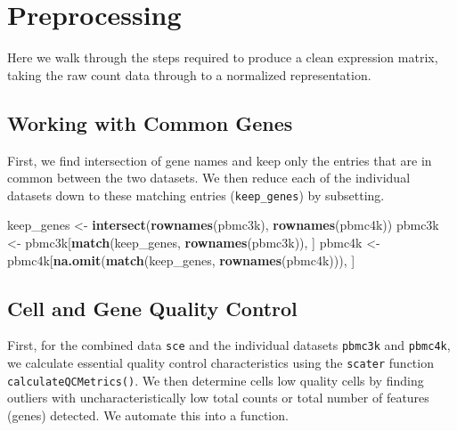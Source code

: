 \documentclass[]{book}
\newenvironment{Shaded}{\begin{snugshade}}{\end{snugshade}}
\newcommand{\KeywordTok}[1]{\textcolor[rgb]{0.13,0.29,0.53}{\textbf{#1}}}
\newcommand{\NormalTok}[1]{#1}
\newcommand{\StringTok}[1]{\textcolor[rgb]{0.31,0.60,0.02}{#1}}
\begin{document}
\hypertarget{preprocessing}{%
\section{Preprocessing}\label{preprocessing}}

Here we walk through the steps required to produce a clean expression matrix, taking the raw count data through to a normalized representation.

\hypertarget{working-with-common-genes}{%
\subsection{Working with Common Genes}\label{working-with-common-genes}}

First, we find intersection of gene names and keep only the entries that are in common between the two datasets. We then reduce each of the individual datasets down to these matching entries (\texttt{keep\_genes}) by subsetting.

\begin{Shaded}
\begin{Highlighting}[]
\NormalTok{keep_genes <-}\StringTok{ }\KeywordTok{intersect}\NormalTok{(}\KeywordTok{rownames}\NormalTok{(pbmc3k), }\KeywordTok{rownames}\NormalTok{(pbmc4k))}
\NormalTok{pbmc3k <-}\StringTok{ }\NormalTok{pbmc3k[}\KeywordTok{match}\NormalTok{(keep_genes, }\KeywordTok{rownames}\NormalTok{(pbmc3k)), ]}
\NormalTok{pbmc4k <-}\StringTok{ }\NormalTok{pbmc4k[}\KeywordTok{na.omit}\NormalTok{(}\KeywordTok{match}\NormalTok{(keep_genes, }\KeywordTok{rownames}\NormalTok{(pbmc4k))), ]}
\end{Highlighting}
\end{Shaded}

\hypertarget{cell-and-gene-quality-control}{%
\subsection{Cell and Gene Quality Control}\label{cell-and-gene-quality-control}}

First, for the combined data \texttt{sce} and the individual datasets \texttt{pbmc3k} and \texttt{pbmc4k}, we calculate essential quality control characteristics using the \texttt{scater} function \texttt{calculateQCMetrics()}. We then determine cells low quality cells by finding outliers with uncharacteristically low total counts or total number of features (genes) detected. We automate this into a function.
\end{document}
